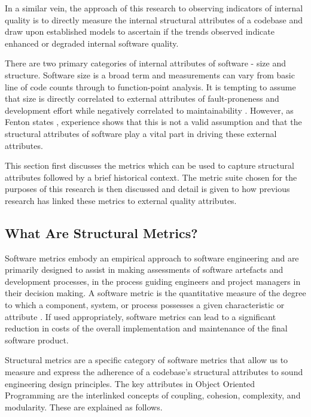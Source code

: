 In a similar vein, the approach of this research to observing indicators of internal quality is to directly measure the internal structural attributes of a codebase and draw upon established models to ascertain if the trends observed indicate enhanced or degraded internal software quality.

There are two primary categories of internal attributes of software - size and structure. Software size is a broad term and measurements can vary from basic line of code counts through to function-point analysis. It is tempting to assume that size is directly correlated to external attributes of fault-proneness and development effort while negatively correlated to maintainability \citep{akiyama1971example}. However, as Fenton states \citep{fenton2014software}, experience shows that this is not a valid assumption and that the structural attributes of software play a vital part in driving these external attributes.
 
This section first discusses the metrics which can be used to capture structural attributes followed by a brief historical context. The metric suite chosen for the purposes of this research is then discussed and detail is given to how previous research has linked these metrics to external quality attributes.

\subsection{What Are Structural Metrics?}
Software metrics embody an empirical approach to software engineering and are primarily designed to assist in making assessments of software artefacts and development processes, in the process guiding engineers and project managers in their decision making. A software metric is the quantitative measure of the degree to which a component, system, or process possesses a given characteristic or attribute \citep{ordonez2008state}. If used appropriately, software metrics can lead to a significant reduction in costs of the overall implementation and maintenance of the final software product. 

Structural metrics are a specific category of software metrics that allow us to measure and express the adherence of a codebase's structural attributes to sound engineering design principles. The key attributes in Object Oriented Programming are the interlinked concepts of coupling, cohesion, complexity, and modularity. These are explained as follows.

